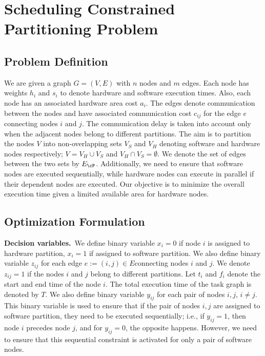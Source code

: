 \section{Scheduling Constrained Partitioning Problem}

\subsection{Problem Definition}
We are given a graph $G=\left(V,E\right)$ with $n$ nodes and $m$ edges. 
Each node has weights $h_i$ and $s_i$ to denote hardware and software execution times.
Also, each node has an associated hardware area cost $a_i$.
The edges denote communication between the nodes and have associated communication cost $c_{ij}$ for the edge $e$ connecting nodes $i$ and $j$.
The communication delay is taken into account only when the adjacent nodes belong to different partitions.
The aim is to partition the nodes $V$ into non-overlapping sets $V_S$ and $V_H$ denoting software and hardware nodes respectively; $V=V_H \cup V_S$ and $V_H \cap V_S = \emptyset$.
We denote the set of edges between the two sets by $E_{\cP}$. 
Additionally, we need to ensure that software nodes are executed sequentially, while hardware nodes can execute in parallel if their dependent nodes are executed.
Our objective is to minimize the overall execution time given a limited available area for hardware nodes.

\subsection{Optimization Formulation}

\noindent\textbf{Decision variables.}~We define binary variable $x_i=0$ if node $i$ is assigned to hardware partition, $x_i=1$ if assigned to software partition.
We also define binary variable $z_{ij}$ for each edge $e:=\left(i,j\right)\in E$connecting nodes $i$ and $j$. We denote $z_{ij}=1$ if the nodes $i$ and $j$ belong to different partitions.
Let $t_i$ and $f_i$ denote the start and end time of the node $i$. The total execution time of the task graph is denoted by $T$.
We also define binary variable $y_{ij}$ for each pair of nodes $i,j$, $i \neq j$.
This binary variable is used to ensure that if the pair of nodes $i,j$ are assigned to software partition, they need to be executed sequentially; i.e., if $y_{ij}=1$, then node $i$ precedes node $j$, and for $y_{ij}=0$, the opposite happens.
However, we need to ensure that this sequential constraint is activated for only a pair of software nodes.

